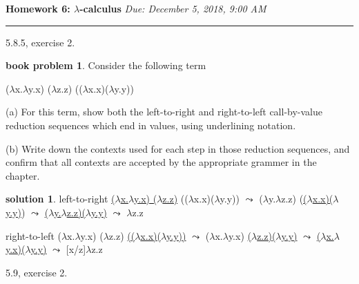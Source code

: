 \documentclass[10pt]{article}
\theoremstyle{definition}
\newtheorem{bp}{book problem}
\newtheorem{sol}{solution}
\begin{document}
\noindent
\textbf{Homework 6: $\lambda$-calculus} \hfill \emph{Due: December 5, 2018, 9:00 AM}
\hrule

\vspace{.3in}

5.8.5, exercise 2.

\begin{bp}
  Consider the following term

  ($\lambda$x.$\lambda$y.x) ($\lambda$z.z) (($\lambda$x.x)($\lambda$y.y))

  (a) For this term, show both the left-to-right and right-to-left call-by-value reduction sequences which end in values, using underlining notation.

  (b) Write down the contexts used for each step in those reduction sequences, and confirm that all contexts are accepted by the appropriate grammer in the chapter. 

\end{bp}

\begin{sol}
left-to-right \newline
  \indent \indent \underline{($\lambda$x.$\lambda$y.x) ($\lambda$z.z)} (($\lambda$x.x)($\lambda$y.y)) \newline
  $\leadsto$   ($\lambda$y.$\lambda$z.z) (\underline{($\lambda$x.x)($\lambda$y.y)}) \newline
  $\leadsto$  \underline{($\lambda$y.$\lambda$z.z)($\lambda$y.y)} \newline
  $\leadsto$ $\lambda$z.z \newline

  right-to-left \newline
  \indent \indent ($\lambda$x.$\lambda$y.x) ($\lambda$z.z) \underline{(($\lambda$x.x)($\lambda$y.y))} \newline
  $\leadsto$   ($\lambda$x.$\lambda$y.x) \underline{($\lambda$z.z)($\lambda$y.y)} \newline
  $\leadsto$  \underline{($\lambda$x.$\lambda$y.x)($\lambda$y.y)} \newline
  $\leadsto$ [x/z]$\lambda$z.z \newline
 



\end{sol}

5.9, exercise 2.
\end{document}
